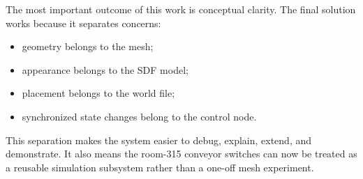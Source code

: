 \documentclass[11pt,a4paper]{article}
\begin{document}
The most important outcome of this work is conceptual clarity. The final solution works because it separates concerns:
\begin{itemize}
\item geometry belongs to the mesh;
\item appearance belongs to the SDF model;
\item placement belongs to the world file;
\item synchronized state changes belong to the control node.
\end{itemize}

This separation makes the system easier to debug, explain, extend, and demonstrate. It also means the room-315 conveyor switches can now be treated as a reusable simulation subsystem rather than a one-off mesh experiment.
\end{document}
